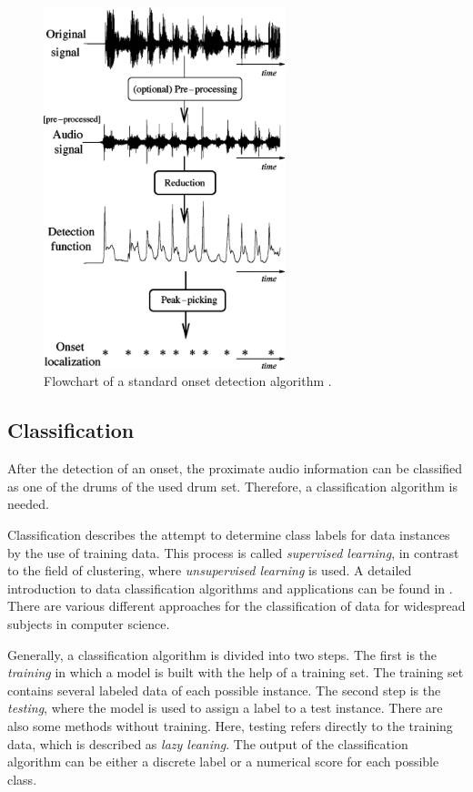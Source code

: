 \begin{figure}[h]
	\centering
	\includegraphics[width=7.0cm]{images/bello_2005_Seite_02_Bild_0001.png}
	\caption{Flowchart of a standard onset detection algorithm \autocite[Fig. 2]{Bello:2005}.}
	\label{fig:OnsetDetection2}
\end{figure}



\subsection{Classification}

After the detection of an onset, the proximate audio information can be classified as one of the drums of the used drum set. Therefore, a classification algorithm is needed. 

Classification describes the attempt to determine class labels for data instances by the use of training data. This process is called \textit{supervised learning}, in contrast to the field of clustering, where \textit{unsupervised learning} is used. A detailed introduction to data classification algorithms and applications can be found in \autocite{Chapman:2015}. There are various different approaches for the classification of data for widespread subjects in computer science.

Generally, a classification algorithm is divided into two steps. The first is the \textit{training} in which a model is built with the help of a training set. The training set contains several labeled data of each possible instance. The second step is the \textit{testing}, where the model is used to assign a label to a test instance. There are also some methods without training. Here, testing refers directly to the training data, which is described as \textit{lazy leaning}. The output of the classification algorithm can be either a discrete label or a numerical score for each possible class.

